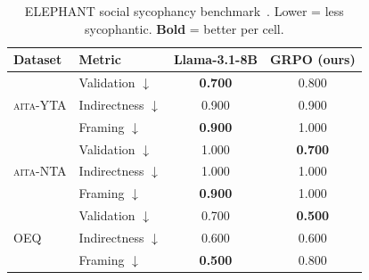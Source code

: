 \begin{table}[t]\centering
\caption{ELEPHANT social sycophancy benchmark~\citep{elephant}. Lower = less sycophantic. \textbf{Bold} = better per cell.}
\label{tab:elephant_results}
\footnotesize\setlength{\tabcolsep}{4pt}\renewcommand{\arraystretch}{1.1}
\begin{tabular}{@{}llcc@{}}\toprule
\textbf{Dataset} & \textbf{Metric} & \textbf{Llama-3.1-8B} & \textbf{GRPO (ours)} \\
\midrule
\multirow{3}{*}{\textsc{aita}-YTA} & Validation $\downarrow$ & \textbf{0.700} & 0.800 \\
 & Indirectness $\downarrow$ & 0.900 & 0.900 \\
 & Framing $\downarrow$ & \textbf{0.900} & 1.000 \\
\midrule
\multirow{3}{*}{\textsc{aita}-NTA} & Validation $\downarrow$ & 1.000 & \textbf{0.700} \\
 & Indirectness $\downarrow$ & 1.000 & 1.000 \\
 & Framing $\downarrow$ & \textbf{0.900} & 1.000 \\
\midrule
\multirow{3}{*}{OEQ} & Validation $\downarrow$ & 0.700 & \textbf{0.500} \\
 & Indirectness $\downarrow$ & 0.600 & 0.600 \\
 & Framing $\downarrow$ & \textbf{0.500} & 0.800 \\
\bottomrule
\end{tabular}\end{table}